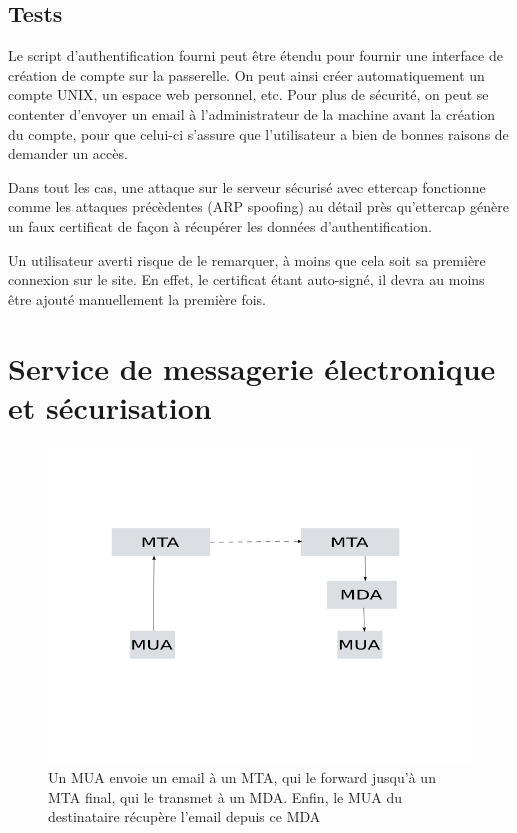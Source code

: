 \documentclass[a4paper]{article}
\begin{document}
\subsection{Tests}
Le script d'authentification fourni peut être étendu pour
fournir une interface de création de compte sur la passerelle.
On peut ainsi créer automatiquement un compte UNIX, un espace
web personnel, etc. Pour plus de sécurité, on peut se contenter
d'envoyer un email à l'administrateur de la machine avant la
création du compte, pour que celui-ci s'assure que l'utilisateur
a bien de bonnes raisons de demander un accès.

Dans tout les cas, une attaque sur le serveur sécurisé avec
ettercap fonctionne comme les attaques précèdentes (ARP spoofing)
au détail près qu'ettercap génère un faux certificat de façon
à récupérer les données d'authentification.

Un utilisateur averti risque de le remarquer, à moins que cela
soit sa première connexion sur le site. En effet, le certificat
étant auto-signé, il devra au moins être ajouté manuellement
la première fois.
\section{Service de messagerie électronique et sécurisation}
\begin{figure}[!ht]
	\centering
	\includegraphics[scale=.5]{emailrouting.png}
	\caption{\label{emailrouting} Un MUA envoie un email à un MTA, qui
		le forward jusqu'à un MTA final, qui le transmet à un MDA.
		Enfin, le MUA du destinataire récupère l'email depuis ce MDA}
\end{figure}
\end{document}
